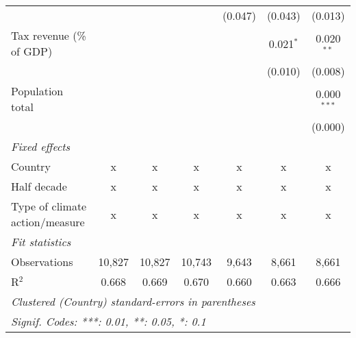 \begin{tabular}{lcccccc}
                                                &         &               &                & (0.047)        & (0.043)        & (0.013)\\   
   Tax revenue (\% of GDP)                      &         &               &                &                & 0.021$^{*}$    & 0.020$^{**}$\\   
                                                &         &               &                &                & (0.010)        & (0.008)\\   
   Population total                             &         &               &                &                &                & 0.000$^{***}$\\   
                                                &         &               &                &                &                & (0.000)\\   
   \emph{Fixed effects}\\
   Country                                      & x       & x             & x              & x              & x              & x\\  
   Half decade                                  & x       & x             & x              & x              & x              & x\\  
   Type of climate action/measure               & x       & x             & x              & x              & x              & x\\  
   \midrule \emph{Fit statistics}\\
   Observations                                 & 10,827  & 10,827        & 10,743         & 9,643          & 8,661          & 8,661\\  
   R$^2$                                        & 0.668   & 0.669         & 0.670          & 0.660          & 0.663          & 0.666\\  
   \midrule
   \multicolumn{7}{l}{\emph{Clustered (Country) standard-errors in parentheses}}\\
   \multicolumn{7}{l}{\emph{Signif. Codes: ***: 0.01, **: 0.05, *: 0.1}}\\
\end{tabular}
\par\endgroup


